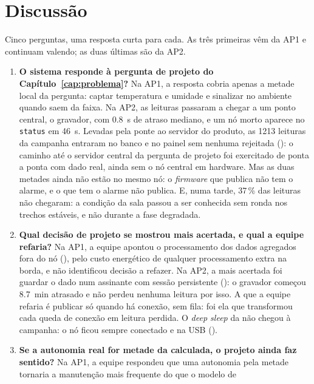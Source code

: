 \section{Discussão}

\begin{orientacao}
Cinco perguntas, uma resposta curta para cada. As três primeiras vêm da
AP1 e continuam valendo; as duas últimas são da AP2.
\end{orientacao}

\begin{enumerate}[label=\arabic*.]
  \item \textbf{O sistema responde à pergunta de projeto do
    Capítulo~\ref{cap:problema}?} Na AP1, a resposta cobria apenas a
    metade local da pergunta: captar temperatura e umidade e sinalizar
    no ambiente quando saem da faixa. Na AP2, as leituras passaram a
    chegar a um ponto central, o gravador, com \SI{0,8}{\second} de
    atraso mediano, e um nó morto aparece no \texttt{status} em
    \SI{46}{\second}. Levadas pela ponte ao servidor do produto, as
    \num{1213} leituras da campanha entraram no banco e no painel sem
    nenhuma rejeitada (): o caminho até o servidor central da
    pergunta de projeto foi exercitado de ponta a ponta com dado real,
    ainda sem o nó central em hardware. Mas as duas metades ainda não estão no mesmo nó: o
    \emph{firmware} que publica não tem o alarme, e o que tem o alarme
    não publica. E, numa tarde, 37\,\% das leituras não chegaram: a
    condição da sala passou a ser conhecida sem ronda nos trechos
    estáveis, e não durante a fase degradada.
  \item \textbf{Qual decisão de projeto se mostrou mais acertada, e qual
    a equipe refaria?} Na AP1, a equipe apontou o processamento dos dados
    agregados fora do nó (), pelo custo energético de qualquer
    processamento extra na borda, e não identificou decisão a refazer.
    Na AP2, a mais acertada foi guardar o dado num assinante com sessão
    persistente (): o gravador começou \SI{8,7}{\minute} atrasado e
    não perdeu nenhuma leitura por isso. A que a equipe refaria é
    publicar só quando há conexão, sem fila: foi ela que transformou cada
    queda de conexão em leitura perdida. O \emph{deep sleep} da 
    não chegou à campanha: o nó ficou sempre conectado e na USB
    ().
  \item \textbf{Se a autonomia real for metade da calculada, o projeto
    ainda faz sentido?} Na AP1, a equipe respondeu que uma autonomia pela
    metade tornaria a manutenção mais frequente do que o modelo de

\end{enumerate}
